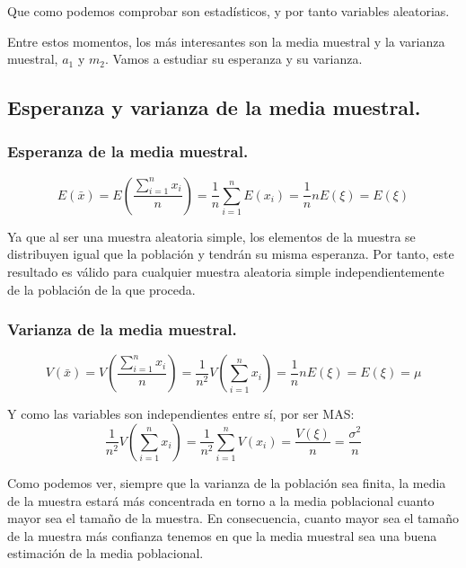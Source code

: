 Que como podemos comprobar son estad\'isticos, y por tanto variables aleatorias.

Entre estos momentos, los m\'as interesantes son la media muestral y la varianza muestral, $a_1$ y $m_2$. Vamos a estudiar su esperanza y su varianza.

\subsection{Esperanza y varianza de la media muestral.}

\subsubsection{Esperanza de la media muestral.}
\begin{equation*}
E\left(\bar{x}\right)=E\left(\dfrac{\sum_{i=1}^nx_i}{n}\right)=\dfrac{1}{n}\sum_{i=1}^nE\left(x_i\right)=\dfrac{1}{n}nE\left(\xi\right)=E\left(\xi\right)
\end{equation*}

Ya que al ser una muestra aleatoria simple, los elementos de la muestra se distribuyen igual que la poblaci\'on y tendr\'an su misma esperanza. Por tanto, este resultado es v\'alido para cualquier muestra aleatoria simple independientemente de la poblaci\'on de la que proceda.

\subsubsection{Varianza de la media muestral.}

\begin{equation*}
V\left(\bar{x}\right)=V\left(\dfrac{\sum_{i=1}^nx_i}{n}\right)=\dfrac{1}{n^2}V\left(\sum_{i=1}^nx_i\right)=\dfrac{1}{n}nE\left(\xi\right)=E\left(\xi\right)=\mu
\end{equation*}

Y como las variables son independientes entre s\'i, por ser MAS:
\begin{equation*}
\dfrac{1}{n^2}V\left(\sum_{i=1}^nx_i\right)=\dfrac{1}{n^2}\sum_{i=1}^nV\left(x_i\right)=\dfrac{V(\xi)}{n}=\dfrac{\sigma^2}{n}
\end{equation*}

Como podemos ver, siempre que la varianza de la poblaci\'on sea finita, la media de la muestra estar\'a m\'as concentrada en torno a la media poblacional cuanto mayor sea el tama\~no de la muestra. En consecuencia, cuanto mayor sea el tama\~no de la muestra m\'as confianza tenemos en que la media muestral sea una buena estimaci\'on de la media poblacional.

